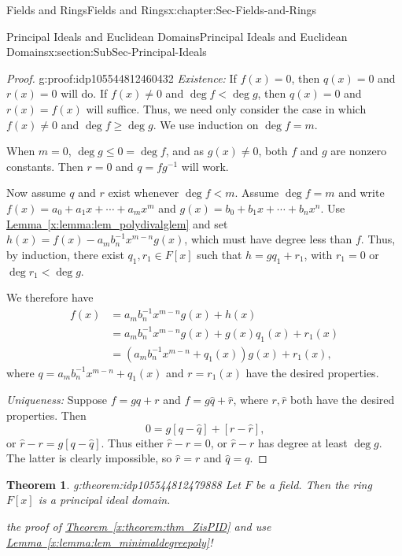 \documentclass[oneside,10pt,]{book}
\newcommand{\xreffont}{\relax}
\numberwithin{equation}{section}
\renewcommand{\le}{\leqslant}
\renewcommand{\ge}{\geqslant}
\newtheorem{theorem}{Theorem}[section]
\newcommand{\lt}{<}
\newcommand{\amp}{&}
\begin{document}
\begin{chapterptx}{Fields and Rings}{}{Fields and Rings}{}{}{x:chapter:Sec-Fields-and-Rings}
\begin{sectionptx}{Principal Ideals and Euclidean Domains}{}{Principal Ideals and Euclidean Domains}{}{}{x:section:SubSec-Principal-Ideals}
\begin{proof}{}{g:proof:idp105544812460432}
\emph{Existence:} If \(f(x) = 0\), then \(q(x) = 0\) and \(r(x) = 0\) will do. If \(f(x)\ne 0\) and \(\deg f \lt \deg g\), then \(q(x) = 0\) and \(r(x) = f(x)\) will suffice. Thus, we need only consider the case in which \(f(x) \ne 0\) and \(\deg f \ge \deg g\). We use induction on \(\deg f = m\).%
\par
When \(m = 0\), \(\deg g \le 0 = \deg f\), and as \(g(x) \ne 0\), both \(f\) and \(g\) are nonzero constants. Then \(r = 0\) and \(q = fg^{-1}\) will work.%
\par
Now assume \(q\) and \(r\) exist whenever \(\deg f \lt m\). Assume \(\deg f = m\) and write \(f(x) = a_0 + a_1 x + \cdots + a_m x^m\) and \(g(x) = b_0 + b_1 x + \cdots + b_n x^n\). Use \hyperref[x:lemma:lem_polydivalglem]{Lemma~{\xreffont\ref{x:lemma:lem_polydivalglem}}} and set \(h(x) = f(x) - a_m b_n^{-1} x^{m-n} g(x)\), which must have degree less than \(f\). Thus, by induction, there exist \(q_1, r_1\in F[x]\) such that \(h = g q_1 + r_1\), with \(r_1 = 0\) or \(\deg r_1 \lt \deg g\).%
\par
We therefore have%
\begin{align*}
f(x) \amp = a_m b_n^{-1} x^{m-n} g(x) + h(x)\\
\amp = a_m b_n^{-1} x^{m-n} g(x) + g(x) q_1(x) + r_1(x)\\
\amp = (a_m b_n^{-1} x^{m-n} + q_1(x)) g(x) + r_1(x)\text{,}
\end{align*}
where \(q = a_m b_n^{-1} x^{m-n} + q_1(x)\) and \(r = r_1(x)\) have the desired properties.%
\par
\emph{Uniqueness:} Suppose \(f = gq + r\) and \(f = g\hat{q} + \hat{r}\), where \(r,\hat{r}\) both have the desired properties. Then%
\begin{equation*}
0 = g[q - \hat{q}] + [r - \hat{r}]\text{,}
\end{equation*}
or \(\hat{r} - r = g [q - \hat{q}]\). Thus either \(\hat{r} - r = 0\), or \(\hat{r} - r\) has degree at least \(\deg g\). The latter is clearly impossible, so \(\hat{r} = r\) and \(\hat{q} = q\).%
\end{proof}
\begin{theorem}{}{}{g:theorem:idp105544812479888}%
Let \(F\) be a field. Then the ring \(F[x]\) is a principal ideal domain.%
\par\smallskip%
\noindentMimic the proof of \hyperref[x:theorem:thm_ZisPID]{Theorem~{\xreffont\ref{x:theorem:thm_ZisPID}}} and use \hyperref[x:lemma:lem_minimaldegreepoly]{Lemma~{\xreffont\ref{x:lemma:lem_minimaldegreepoly}}}!%

\end{theorem}
\end{sectionptx}
\end{chapterptx}
\end{document}
